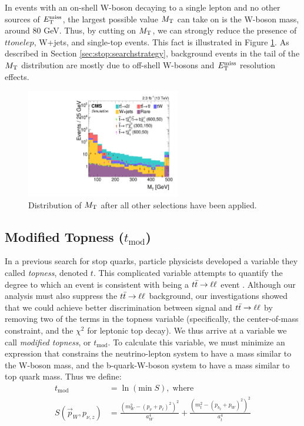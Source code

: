 In events with an on-shell W-boson decaying to a single lepton and no
other sources of $E_\text{T}^\text{miss}$, the largest possible value $M_\text{T}$ can take on
is the W-boson mass, around 80 GeV. Thus, by cutting on $M_\text{T}$, we can
strongly reduce the presence of $ttonelep$, W+jets, and single-top
events. This fact is illustrated in Figure
\ref{fig:stop:mt:nminusone}. As described in Section
\ref{sec:stop:searchstrategy}, background events in the tail of the
$M_\text{T}$ distribution are mostly due to off-shell W-bosons and $E_\text{T}^\text{miss}$
resolution effects.

\begin{figure}[htb]
\centering
\includegraphics[width=0.6\textwidth]{figures/nminusone_mt.pdf}
\caption{Distribution of $M_\text{T}$ after all other selections have been applied.}
\label{fig:stop:mt:nminusone}
\end{figure}

\subsection{Modified Topness (\texorpdfstring{$t_{\text{mod}}$}{tmod})}
\label{ssec:stop:tmod}

In a previous search for stop quarks, particle physicists developed a
variable they called \emph{topness}, denoted $t$. This complicated
variable attempts to quantify the degree to which an event is
consistent with being a $t\bar{t} \rightarrow \ell\ell$ event \cite{topness}. Although our
analysis must also suppress the $t\bar{t} \rightarrow \ell\ell$ background, our
investigations showed that we could achieve better discrimination
between signal and $t\bar{t} \rightarrow \ell\ell$ by removing two of the terms in the
topness variable (specifically, the center-of-mass constraint, and the
$\chi^2$ for leptonic top decay). We thus arrive at a variable we call
\emph{modified topness}, or $t_\text{mod}$. To calculate this
variable, we must minimize an expression that constrains the
neutrino-lepton system to have a mass similar to the W-boson mass, and the
b-quark-W-boson system to have a mass similar to top quark mass. Thus
we define:
\begin{equation}
\label{eq:stop:tmod}
\begin{split}
t_\text{mod} & = \ln ( \text{min} \; S ), \; \text{where} \\
S(\vec{p}_W, p_{\nu,z}) & = \frac{(m_W^2-(p_\nu+p_\ell)^2)^2}{a_W^4} + \frac{(m_t^2 - (p_{b_2}+p_W)^2)^2}{a_t^4}
\end{split}
\end{equation}

